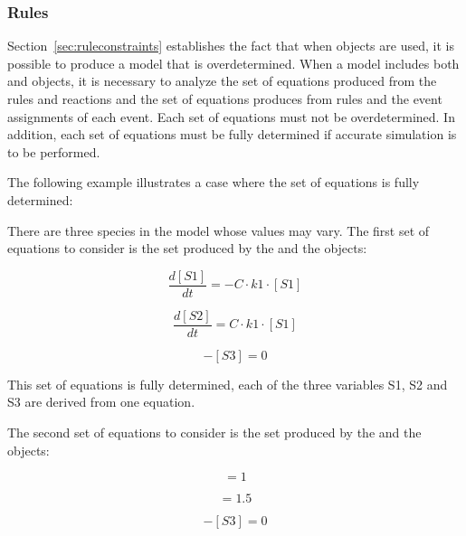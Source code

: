 \subsubsection{Rules}
\label{sec:bp:rules}

Section~\ref{sec:ruleconstraints} establishes the fact that when
\AlgebraicRule objects are used, it is possible to produce a model
that is overdetermined.  When a model includes both \Event and
\Reaction objects, it is necessary to analyze the set of equations
produced from the rules and reactions and the set of equations
produces from rules and the event assignments of each event.  Each
set of equations must not be overdetermined.  In addition, each
set of equations must be fully determined if accurate simulation
is to be performed.

The following example illustrates a case where the set of
equations is fully determined:


There are three species in the model whose values may vary.  The
first set of equations to consider is the set produced by the
\Reaction and the \AlgebraicRule objects:
\begin{linenomath}
\begin{equation*}
  \frac{d [S1]}{d t} = - C \cdot k1 \cdot [S1]
\end{equation*}
\end{linenomath}
\begin{linenomath}
\begin{equation*}
  \frac{d [S2]}{d t} = C \cdot k1 \cdot [S1]
\end{equation*}
\end{linenomath}
\begin{linenomath}
\begin{equation*}
  [S1] - [S3] = 0
\end{equation*}
\end{linenomath}

This set of equations is fully determined, \ie each of the three
variables S1, S2 and S3 are derived from one equation.

The second set of equations to consider is the set produced by the
\Event and the \AlgebraicRule objects:
\begin{linenomath}
\begin{equation*}
  [S1] = 1
\end{equation*}
\end{linenomath}
\begin{linenomath}
\begin{equation*}
  [S2] = 1.5
\end{equation*}
\end{linenomath}
\begin{linenomath}
\begin{equation*}
  [S1] - [S3] = 0
\end{equation*}
\end{linenomath}

